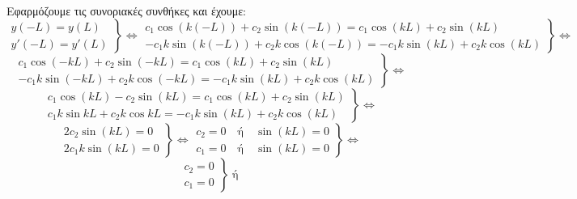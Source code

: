 \documentclass[a4paper,table]{report}
\begin{document}
\begin{solution}
\begin{myitemize}
\begin{align*}
      \end{align*}
      Εφαρμόζουμε τις συνοριακές συνθήκες και έχουμε:
      \[
        \left.
          \begin{matrix}
            y(-L)=y(L) \\
            y'(-L)=y'(L)
          \end{matrix} 
        \right\} \Leftrightarrow 
        \left.
          \begin{matrix}
            c_{1} \cos{(k(-L))} + c_{2} \sin{(k(-L))} = c_{1} \cos{(kL)} + 
            c_{2} \sin{(kL)} \\
            - c_{1} k \sin{(k(-L))} + c_{2} k \cos{(k(-L))} = - c_{1}k \sin{(kL)} + 
            c_{2} k\cos{(kL)}
          \end{matrix} 
        \right\} \Leftrightarrow 
      \]
      \[
        \left.
          \begin{matrix}
            c_{1} \cos{(-kL)} + c_{2} \sin{(-kL)} = c_{1} \cos{(kL)} + c_{2} 
            \sin{(kL)} \\
            - c_{1} k \sin{(-kL)} + c_{2} k \cos{(-kL)} = - c_{1}k \sin{(kL)} + 
            c_{2} k\cos{(kL)}
          \end{matrix} 
        \right\} \Leftrightarrow 
      \]
      \[
        \left.
          \begin{matrix}
            c_{1} \cos{(kL)} - c_{2} \sin{(kL)} = c_{1} \cos{(kL)} + c_{2} \sin{(kL)} \\
            c_{1} k \sin{kL} + c_{2} k \cos{kL} = - c_{1}k \sin{(kL)} + c_{2} k\cos{(kL)}
          \end{matrix}
        \right\} \Leftrightarrow 
      \]
      \[
        \left.
          \begin{matrix}
            2 c_{2} \sin{(kL)} = 0 \\
            2 c_{1} k \sin{(kL)} = 0
          \end{matrix} 
        \right\} \Leftrightarrow 
        \left.
          \begin{matrix}
            c_{2} = 0 \quad \text{ή} \quad \sin{(kL)} = 0 \\
            c_{1} = 0 \quad \text{ή} \quad \sin{(kL)} = 0
          \end{matrix} 
        \right\} \Leftrightarrow 
      \]
      \[
        \left.
          \begin{matrix}
            c_{2} = 0 \\
            c_{1} = 0
          \end{matrix} 
        \right\} \; \text{ή} \; 
\]
\end{myitemize}
\end{solution}
\end{document}
